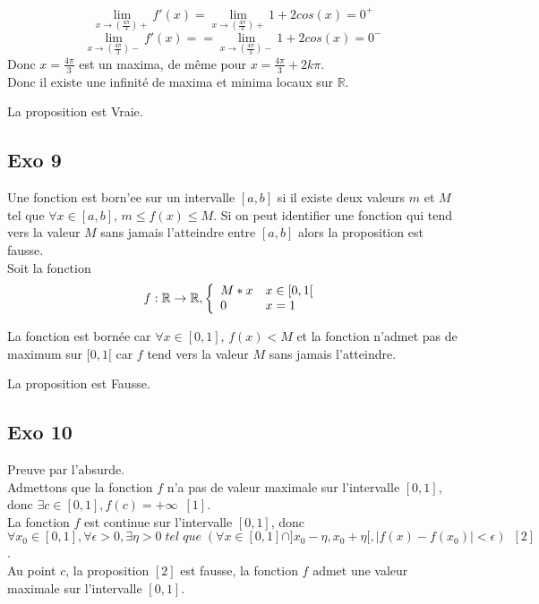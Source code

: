 \documentclass[]{book}
\theoremstyle{definition}
\newcommand{\bb}[1]{\mathbb{#1}}
\newcommand{\R}{\bb{R}}
\begin{document}
$$\lim_{x \to (\frac{4\pi}{3})+} f'(x) = \lim_{x \to (\frac{4\pi}{3})+} 1 + 2cos(x) = 0^+$$
$$\lim_{x \to (\frac{4\pi}{3})-} f'(x) =  = \lim_{x \to (\frac{4\pi}{3})-} 1 + 2cos(x) = 0^-$$  
Donc  $x=\frac{4\pi}{3}$ est un maxima, de m\^eme pour $x=\frac{4\pi}{3} + 2k\pi$. \\

Donc il existe une infinit\'e de maxima et minima locaux sur $\R$.

La proposition est Vraie.\\


\subsection*{Exo 9}
Une fonction est born'ee sur un intervalle $[a,b]$ si il existe deux valeurs $m$ et $M$ tel que $\forall x \in [a,b],\, m \leq f(x) \leq M$. Si on peut identifier une fonction qui tend vers la valeur $M$ sans jamais l'atteindre entre $[a,b]$ alors la proposition est fausse.\\

Soit la fonction
$$f: \R \to \R,
\left\{ 
\begin{array}{l l}
 M *x & x \in [0,1[\\
 0 & x = 1\\
\end{array}
\right. 
$$

La fonction est born\'ee car $\forall x \in [0,1], \, f(x) < M$ et la fonction n'admet pas de maximum sur $[0,1[$ car $f$ tend vers la valeur $M$ sans jamais l'atteindre. 

La proposition est Fausse.

\subsection*{Exo 10}
Preuve par l'absurde. \\

Admettons que la fonction $f$ n'a pas de valeur maximale sur l'intervalle $[0,1]$, donc $\exists c \in [0,1], f(c) = +\infty\,\,\,[1]$.\\

La fonction $f$ est continue sur l'intervalle $[0,1]$, donc $\forall x_0 \in [0,1], \forall \epsilon >0, \exists \eta > 0\; tel\; que\; (\forall x \in [0,1] \cap ]x_0-\eta, x_0+\eta[, |f(x)-f(x_0)| < \epsilon)\,\,\,[2]$. \\ 

Au point $c$, la proposition $[2]$ est fausse, la fonction $f$ admet une valeur maximale sur l'intervalle $[0,1]$.\\
\end{document}
